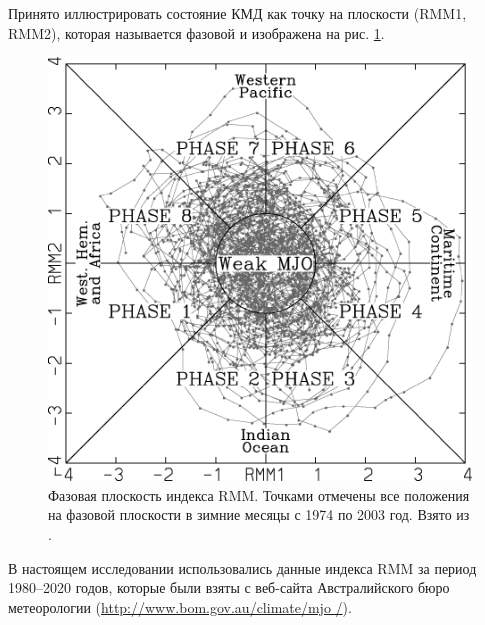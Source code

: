Принято иллюстрировать состояние КМД как точку на плоскости (RMM1, RMM2), которая называется фазовой и изображена на рис. \ref{fig:wh04_fig7}.
\begin{figure}[t]
	\centering
	\includegraphics[width=.49\textwidth]{figures/wh04_fig7.png}
	\caption{Фазовая плоскость индекса RMM. Точками отмечены все положения на фазовой плоскости в зимние месяцы с 1974 по 2003 год. Взято из \cite[рис. 7]{Wheeler_Hendon_2004}.}
	\label{fig:wh04_fig7}
\end{figure}

В настоящем исследовании использовались данные индекса RMM за период 1980--2020 годов, которые были взяты с веб-сайта Австралийского бюро метеорологии (\url{http://www.bom.gov.au/climate/mjo /}).
